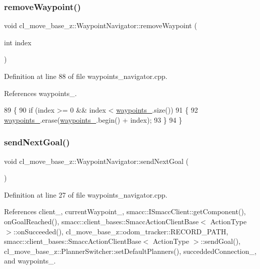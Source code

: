 \subsubsection{\texorpdfstring{remove\+Waypoint()}{removeWaypoint()}}
{\footnotesize\ttfamily void cl\+\_\+move\+\_\+base\+\_\+z\+::\+Waypoint\+Navigator\+::remove\+Waypoint (\begin{DoxyParamCaption}\item[{int}]{index }\end{DoxyParamCaption})}



Definition at line 88 of file waypoints\+\_\+navigator.\+cpp.



References waypoints\+\_\+.


\begin{DoxyCode}
89 \{
90   \textcolor{keywordflow}{if} (index >= 0 && index < \hyperlink{classcl__move__base__z_1_1WaypointNavigator_a727f6a73e15ff5dc6bb3ffdf52c3d832}{waypoints\_}.size())
91   \{
92     \hyperlink{classcl__move__base__z_1_1WaypointNavigator_a727f6a73e15ff5dc6bb3ffdf52c3d832}{waypoints\_}.erase(\hyperlink{classcl__move__base__z_1_1WaypointNavigator_a727f6a73e15ff5dc6bb3ffdf52c3d832}{waypoints\_}.begin() + index);
93   \}
94 \}
\end{DoxyCode}
\mbox{\label{classcl__move__base__z_1_1WaypointNavigator_a1e0a8ff536d2d01a01063fd903029347}} 
\subsubsection{\texorpdfstring{send\+Next\+Goal()}{sendNextGoal()}}
{\footnotesize\ttfamily void cl\+\_\+move\+\_\+base\+\_\+z\+::\+Waypoint\+Navigator\+::send\+Next\+Goal (\begin{DoxyParamCaption}{ }\end{DoxyParamCaption})}



Definition at line 27 of file waypoints\+\_\+navigator.\+cpp.



References client\+\_\+, current\+Waypoint\+\_\+, smacc\+::\+I\+Smacc\+Client\+::get\+Component(), on\+Goal\+Reached(), smacc\+::client\+\_\+bases\+::\+Smacc\+Action\+Client\+Base$<$ Action\+Type $>$\+::on\+Succeeded(), cl\+\_\+move\+\_\+base\+\_\+z\+::odom\+\_\+tracker\+::\+R\+E\+C\+O\+R\+D\+\_\+\+P\+A\+TH, smacc\+::client\+\_\+bases\+::\+Smacc\+Action\+Client\+Base$<$ Action\+Type $>$\+::send\+Goal(), cl\+\_\+move\+\_\+base\+\_\+z\+::\+Planner\+Switcher\+::set\+Default\+Planners(), succedded\+Connection\+\_\+, and waypoints\+\_\+.



